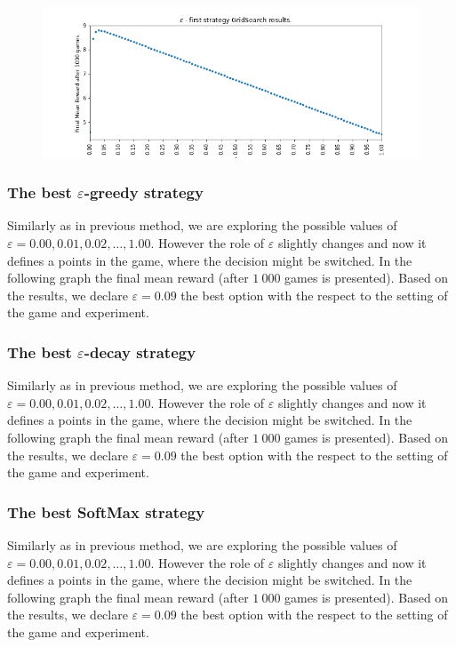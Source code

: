 \documentclass[11pt,american,czech]{article}
\begin{document}
\begin{figure}[h]
	\includegraphics[scale=0.6]{e_fisrt.png}
\end{figure}

\subsubsection*{The best $\varepsilon$-greedy strategy}
Similarly as in previous method, we are exploring the possible values of $\varepsilon=0.00, 0.01, 0.02,\dots, 1.00.$ However the role of $\varepsilon$ slightly changes and now it defines a points in the game, where the decision might be switched. In the following graph the final mean reward (after $1~000$ games is presented). Based on the results, we declare $\varepsilon = 0.09$ the best option with the respect to the setting of the game and experiment.

\subsubsection*{The best $\varepsilon$-decay strategy}
Similarly as in previous method, we are exploring the possible values of $\varepsilon=0.00, 0.01, 0.02,\dots, 1.00.$ However the role of $\varepsilon$ slightly changes and now it defines a points in the game, where the decision might be switched. In the following graph the final mean reward (after $1~000$ games is presented). Based on the results, we declare $\varepsilon = 0.09$ the best option with the respect to the setting of the game and experiment.

\subsubsection*{The best SoftMax strategy}
Similarly as in previous method, we are exploring the possible values of $\varepsilon=0.00, 0.01, 0.02,\dots, 1.00.$ However the role of $\varepsilon$ slightly changes and now it defines a points in the game, where the decision might be switched. In the following graph the final mean reward (after $1~000$ games is presented). Based on the results, we declare $\varepsilon = 0.09$ the best option with the respect to the setting of the game and experiment.
\end{document}
